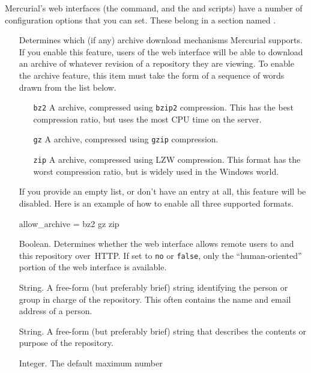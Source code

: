 Mercurial's web interfaces (the  command, and the
 and  scripts) have a
number of configuration options that you can set.  These belong in a
section named .
\begin{itemize}
\item[\rcitem{web}{allow\_archive}] Determines which (if any) archive
  download mechanisms Mercurial supports.  If you enable this
  feature, users of the web interface will be able to download an
  archive of whatever revision of a repository they are viewing.
  To enable the archive feature, this item must take the form of a
  sequence of words drawn from the list below.
  \begin{itemize}
  \item[\texttt{bz2}] A  archive, compressed using
    \texttt{bzip2} compression.  This has the best compression ratio,
    but uses the most CPU time on the server.
  \item[\texttt{gz}] A  archive, compressed using
    \texttt{gzip} compression.
  \item[\texttt{zip}] A  archive, compressed using LZW
    compression.  This format has the worst compression ratio, but is
    widely used in the Windows world.
  \end{itemize}
  If you provide an empty list, or don't have an
   entry at all, this feature will be
  disabled.  Here is an example of how to enable all three supported
  formats.
  \begin{codesample4}
    [web]
    allow_archive = bz2 gz zip
  \end{codesample4}
\item[\rcitem{web}{allowpull}] Boolean.  Determines whether the web
  interface allows remote users to  and  this
  repository over~HTTP.  If set to \texttt{no} or \texttt{false}, only
  the ``human-oriented'' portion of the web interface is available.
\item[\rcitem{web}{contact}] String.  A free-form (but preferably
  brief) string identifying the person or group in charge of the
  repository.  This often contains the name and email address of a
  person.
\item[\rcitem{web}{description}] String.  A free-form (but preferably
  brief) string that describes the contents or purpose of the
  repository.
\item[\rcitem{web}{maxchanges}] Integer.  The default maximum number

\end{itemize}
